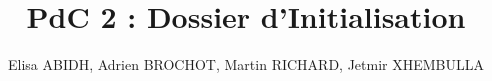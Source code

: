\documentclass[a4paper]{article}
\begin{document}
\title{PdC 2 : Dossier d'Initialisation}
\author{Elisa ABIDH, Adrien BROCHOT, Martin RICHARD, Jetmir XHEMBULLA}

\maketitle


\newpage
\tableofcontents
\newpage


\newpage

\newpage

\newpage

\newpage

\end{document}
